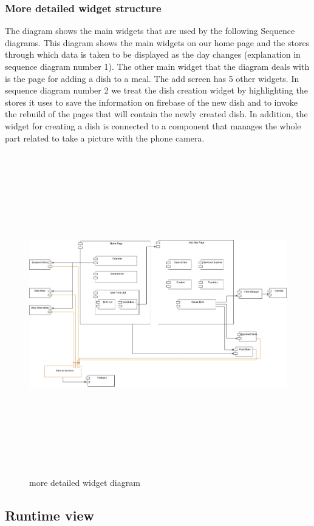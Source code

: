 \documentclass [12pt]{article}
\begin{document}
\subsubsection{More detailed widget structure }
The diagram shows the main widgets that are used by the following Sequence diagrams.
This diagram shows the main widgets on our home page and the stores through which data is taken to be displayed as the day changes (explanation in sequence diagram number 1).
The other main widget that the diagram deals with is the page for adding a dish to a meal. The add screen has 5 other widgets.
In sequence diagram number 2 we treat the dish creation widget by highlighting the stores it uses to save the information on firebase of the new dish and to invoke the rebuild of the pages that will contain the newly created dish. In addition, the widget for creating a dish is connected to a component that manages the whole part related to take a picture with the phone camera.
\begin{figure}[ht!]
\centering
\includegraphics[height=14cm, width=\linewidth]{ComponentDettagliato.png}
\caption{more detailed widget diagram}
\end{figure}

\clearpage

\subsection{Runtime view}
\end{document}
